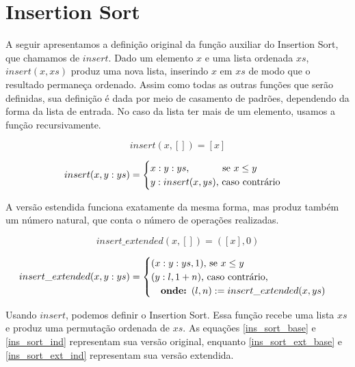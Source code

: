 \documentclass[12pt, oneside, a4paper,english,brazil]{abntex2}
\begin{document}
\section{Insertion Sort}

\qquad A seguir apresentamos a defini\c{c}\~ao original da fun\c{c}\~ao auxiliar do
Insertion Sort, que chamamos de $insert$. Dado um elemento $x$ e uma lista ordenada $xs$,
$insert(x,xs)$ produz uma nova lista, inserindo $x$ em $xs$ de modo que o resultado
permane\c{c}a ordenado. Assim como todas as outras fun\c{c}\~oes que ser\~ao definidas,
sua defini\c{c}\~ao \'e dada por meio de casamento de padr\~oes,
dependendo da forma da lista de entrada. No caso da lista ter mais de um elemento, usamos
a fun\c{c}\~ao recursivamente.

\begin{equation} \label{ins_base}
insert(x, []) = [x]
\end{equation}

\begin{equation} \label{ins_ind}
insert(x, y : ys) =
  \begin{cases}
    x : y : ys \text{, \qquad\,\,\,\,\, se } x \le y\\
    y : insert(x, ys) \text{, caso contr\'ario}
  \end{cases}
\end{equation}

\newpage
\qquad A vers\~ao estendida funciona exatamente da mesma forma, mas produz tamb\'em um
n\'umero natural, que conta o n\'umero de opera\c{c}\~oes realizadas.

\begin{equation} \label{ins_ext_base}
insert\_extended(x, []) = ([x], 0)
\end{equation}

\begin{equation} \label{ins_ext_ind}
insert\_extended(x, y : ys) =
  \begin{cases}
    (x : y : ys, 1) \text{, se } x \le y\\
    (y : l, 1 + n) \text{, caso contr\'ario,}\\ \text{\quad \textbf{onde: }} (l, n) := insert\_extended(x, ys)
  \end{cases}
\end{equation}

\qquad Usando $insert$, podemos definir o Insertion Sort.
Essa fun\c{c}\~ao recebe uma lista $xs$ e produz uma permuta\c{c}\~ao ordenada de $xs$.
As equa\c{c}\~oes \ref{ins_sort_base} e \ref{ins_sort_ind} representam sua vers\~ao original, enquanto
\ref{ins_sort_ext_base} e \ref{ins_sort_ext_ind} representam sua vers\~ao extendida.
\end{document}
